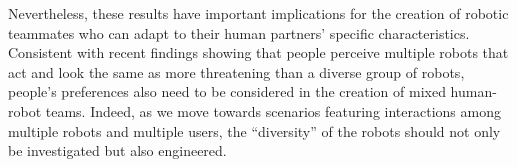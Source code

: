 Nevertheless, these results have important implications for the creation of robotic teammates who can adapt to their human partners' specific characteristics. Consistent with recent findings \cite{fraune2017threatening} showing that people perceive multiple robots that act and look the same as more threatening than a diverse group of robots, people's preferences also need to be considered in the creation of mixed human-robot teams. Indeed, as we move towards scenarios featuring interactions among multiple robots and multiple users, the ``diversity'' of the robots should not only be investigated but also engineered.




